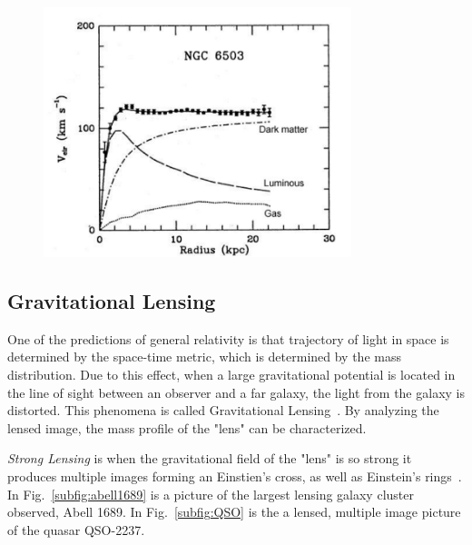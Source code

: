  \begin{figure}[]
	\centering
	\includegraphics[width=0.8\textwidth]{figs/rotationCurve6503.png}
	\label{fig:RotationCurve}
\end{figure}  

\subsection{Gravitational Lensing}
  
One of the predictions of general relativity is that trajectory of light in space is determined by the space-time metric, which is determined by the mass distribution. Due to this effect, when a large gravitational potential is located in the line of sight between an observer and a far galaxy, the light from the galaxy is distorted. This phenomena is called Gravitational Lensing~\cite{Bertone:2010zza}. By analyzing the lensed image, the mass profile of the "lens" can be characterized.

\textit{Strong Lensing} is when the gravitational field of the "lens" is so strong it produces multiple images forming an Einstien's cross, as well as Einstein's rings~\cite{Einstein:1956zz}. In Fig.~\ref{subfig:abell1689} is a picture of the largest lensing galaxy cluster observed, Abell 1689. In Fig.~\ref{subfig:QSO} is the a lensed, multiple image picture of the quasar QSO-2237. 

